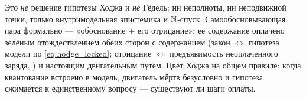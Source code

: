 \begin{remark}
Это \emph{не} решение гипотезы Ходжа и \emph{не} Гёдель: ни неполноты, ни неподвижной точки, только
внутримодельная эпистемика и $\mathbb{N}$-спуск. Самообосновывающая пара формально --- «обоснование $+$ его
отрицание»; её содержание оплачено зелёным отождествлением обеих сторон с содержанием (закон $\iff$
гипотеза модели по \cref{eq:hodge_locked}; отрицание $\iff$ предъявимость неоплаченного заряда,
) и настоящим двигательным путём. Цвет Ходжа на общем
правиле: когда квантование встроено в модель, двигатель мёртв безусловно и гипотеза сжимается к
единственному вопросу --- существуют ли шаги оплаты.
\end{remark}

